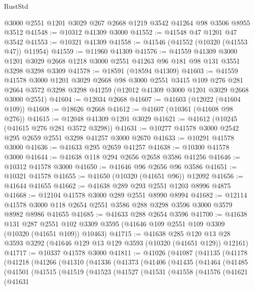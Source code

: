 \begin{lexlean}{RustStd}
\begin{coremodule}
    @3000
    @2551
    @1201
    @3029
    @267
    @2668
    @1219
    @3542
    @41264
    @98
    @3506
    @8955
    @3512
@41548 := @10312 @41309 @3000
@41552 := @41548 @47 @1201 @47 @3542
@41553 := @10321 @41309
@41558 := @41546 (@41552 (@10320 (@41553 @47)) @11954)
@41559 := @11960 @41309
@41576 := @41559
    @41309
    @3000
    @1201
    @3029
    @2668
    @1218
    @3000
    @2551
    @41263
    @96
    @181
    @98
    @131
    @3551
    @3298
    @3298
    @3309
@41578 := @18591 (@18594 @41309)
@41603 := @41559
    @41578
    @3000
    @1201
    @3029
    @2668
    @98
    @3000
    @2551
    @3415
    @109
    @276
    @281
    @2664
    @3572
    @3298
    @3298
    @41259
    (@12012 @41309 @3000 @1201 @3029 @2668 @3000 @2551)
@41604 := @12034 @2668
@41607 := @41603 (@12022 (@41604 @109))
@41608 := @18626 @2668
@41612 := @41607 (@10361 (@41608 @98 @276))
@41615 := @12048 @41309 @1201 @3029
@41621 := @41612 (@10245 (@41615 @276 @281 @3572 @3298))
@41631 := @10277 @41578 @3000 @2542 @295 @2659 @2551 @3298 @41257 @3000 @2670
@41633 := @10291 @41578 @3000
@41636 := @41633 @295 @2659 @41257
@41638 := @10300 @41578 @3000
@41644 := @41638 @118 @294 @2656 @2658 @3586 @41256
@41646 := @10312 @41578 @3000
@41650 := @41646 @96 @2656 @96 @3586
@41651 := @10321 @41578
@41655 := @41650 (@10320 (@41651 @96)) @12092
@41656 := @41644 @41655
@41662 := @41638 @289 @293 @2551 @1203 @8996 @4875
@41668 := @12104 @41578 @3000 @289 @2551 @8990 @8994
@41682 := @12114 @41578 @3000 @118 @2654 @2551 @3586 @288 @3298 @3596 @3000 @3579 @8982 @8986 @41655
@41685 := @41633 @288 @2654 @3596
@41700 := @41638
    @131
    @287
    @2551
    @102
    @3309
    @3595
    (@41646 @109 @2551 @109 @3309 (@10320 (@41651 @109)) @10463)
@41715 := @41638
    @285
    @120
    @13
    @28
    @3593
    @3292
    (@41646 @129 @13 @129 @3593 (@10320 (@41651 @129)) @12161)
@41717 := @10337 @41578 @3000
@41811 := @41026
    (@41087
      (@41135
        (@41178
          (@41218
            (@41266
              (@41310
                (@41336
                  (@41373
                    (@41406
                      (@41435
                        (@41464
                          (@41485
                            (@41501
                              (@41515
                                (@41519
                                  (@41523
                                    (@41527
                                      (@41531
                                        (@41558
                                          (@41576
                                            (@41621
                                              (@41631

\end{coremodule}
\end{lexlean}
